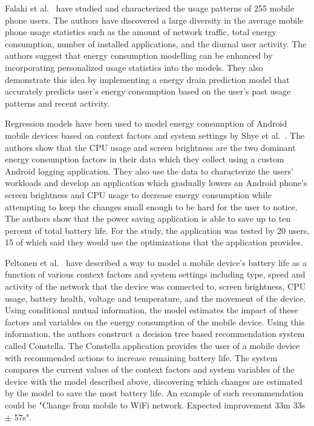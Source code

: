 Falaki et al.~\cite{Falaki:2010:DSU:1814433.1814453} have studied and characterized the usage patterns of 255 mobile phone users. The authors have discovered a large diversity in the average mobile phone usage statistics such as the amount of network traffic, total energy consumption, number of installed applications, and the diurnal user activity. The authors suggest that energy consumption modelling can be enhanced by incorporating personalized usage statistics into the models. They also demonstrate this idea by implementing a energy drain prediction model that accurately predicts user's energy consumption based on the user's past usage patterns and recent activity.          

Regression models have been used to model energy consumption of Android mobile devices based on context factors and system settings by Shye et al.~\cite{5375354}. The authors show that the CPU usage and screen brightness are the two dominant energy consumption factors in their data which they collect using a custom Android logging application. They also use the data to characterize the users' workloads and develop an application which gradually lowers an Android phone's screen brightness and CPU usage to decrease energy consumption while attempting to keep the changes small enough to be hard for the user to notice. The authors show that the power saving application is able to save up to ten percent of total battery life. For the study, the application was tested by 20 users, 15 of which said they would use the optimizations that the application provides.

Peltonen et al.~\cite{PELTONEN201671, 7146507} have described a way to model a mobile device's battery life as a function of various context factors and system settings including type, speed and activity of the network that the device was connected to, screen brightness, CPU usage, battery health, voltage and temperature, and the movement of the device. Using conditional mutual information, the model estimates the impact of these factors and variables on the energy consumption of the mobile device. Using this information, the authors construct a decision tree based recommendation system called Constella. The Constella application provides the user of a mobile device with recommended actions to increase remaining battery life. The system compares the current values of the context factors and system variables of the device with the model described above, discovering which changes are estimated by the model to save the most battery life. An example of such recommendation could be "Change from mobile to WiFi network. Expected improvement 33m 33s $\pm$ 57s".    


